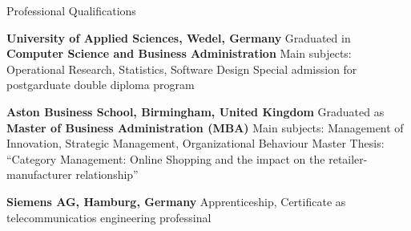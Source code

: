 \begin{rubric}{Professional Qualifications}




\entry*[04/1997--09/2001] \textbf{University of Applied Sciences, Wedel, Germany}\newline
Graduated in \textbf{Computer Science and Business Administration} \newline 
Main subjects: Operational Research, Statistics, Software Design \newline 
Special admission for postgarduate double diploma program

\entry*[10/1999--10/2000] \textbf{Aston Business School, Birmingham, United Kingdom}\newline
Graduated as \textbf{Master of Business Administration (MBA)}\newline 
Main subjects: Management of Innovation, Strategic Management, Organizational Behaviour \newline 
Master Thesis: ``Category Management: Online Shopping and the impact on the retailer-manufacturer relationship''

\entry*[08/1991--02/1995] \textbf{Siemens AG, Hamburg, Germany}\newline 
Apprenticeship, Certificate as telecommunicatios engineering professinal

\end{rubric}
